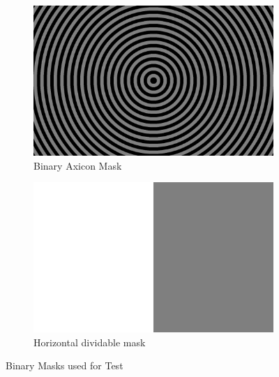 \begin{figure}[h]
    \centering
    \begin{subfigure}{0.5\textwidth}
    \centering
        \includegraphics[width=0.5\linewidth]{pics/slm/binaryaxicon.png}
        \caption{Binary Axicon Mask}
        \label{fig:axiconmask}
    \end{subfigure}%
    \begin{subfigure}{0.5\textwidth}
    \centering
        \includegraphics[width=0.5\linewidth]{pics/slm/hor-div.png}
        \caption{Horizontal dividable mask}
        \label{fig:hordivmask}
    \end{subfigure}
    \caption{Binary Masks used for Test}
    \label{fig:InitMask}
    \end{figure}
    
